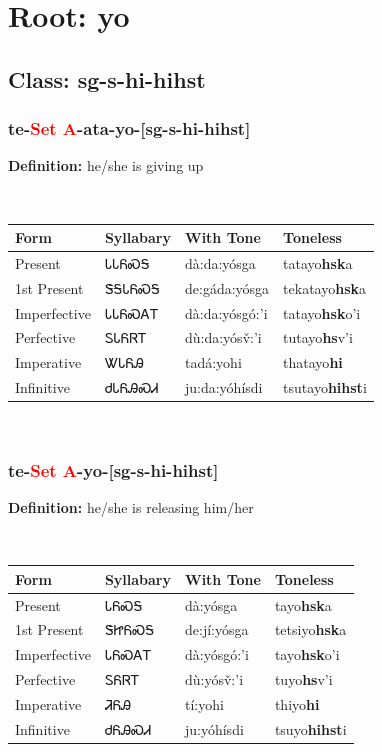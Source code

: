 \needspace{4in}
\section*{Root: yo}
\nopagebreak
{}
\needspace{3in}
\subsection*{Class: sg-s-hi-hihst}
\nopagebreak
\needspace{2in}
\subsubsection*{te{-}\textcolor{Red}{Set A}{-}ata{-}\textbf{yo}{-}[sg-s-hi-hihst]}
\nopagebreak
\textbf{Definition: } he/she is giving up
\\[0.5em]
\begin{tabularx}{\textwidth}{l X X X}%
\toprule%
\textbf{Form}&\textbf{Syllabary}&\textbf{With Tone}&\textbf{Toneless}\\%
\midrule%
Present&ᏓᏓᏲᏍᎦ&dà:da:yósga&tatayo\textbf{hsk}a\\%
1st Present&ᏕᎦᏓᏲᏍᎦ&de:gáda:yósga&tekatayo\textbf{hsk}a\\%
Imperfective&ᏓᏓᏲᏍᎪᎢ&dà:da:yósgó:’i&tatayo\textbf{hsk}o'i\\%
Perfective&ᏚᏓᏲᏒᎢ&dù:da:yósv̌:’i&tutayo\textbf{hs}v'i\\%
Imperative&ᏔᏓᏲᎯ&tadá:yohi&thatayo\textbf{hi}\\%
Infinitive&ᏧᏓᏲᎯᏍᏗ&ju:da:yóhísdi&tsutayo\textbf{hihst}i\\%
\bottomrule%
\end{tabularx}
\\[1em]
\needspace{2in}
\subsubsection*{te{-}\textcolor{Red}{Set A}{-}\textbf{yo}{-}[sg-s-hi-hihst]}
\nopagebreak
\textbf{Definition: } he/she is releasing him/her
\\[0.5em]
\begin{tabularx}{\textwidth}{l X X X}%
\toprule%
\textbf{Form}&\textbf{Syllabary}&\textbf{With Tone}&\textbf{Toneless}\\%
\midrule%
Present&ᏓᏲᏍᎦ&dà:yósga&tayo\textbf{hsk}a\\%
1st Present&ᏕᏥᏲᏍᎦ&de:jí:yósga&tetsiyo\textbf{hsk}a\\%
Imperfective&ᏓᏲᏍᎪᎢ&dà:yósgó:’i&tayo\textbf{hsk}o'i\\%
Perfective&ᏚᏲᏒᎢ&dù:yósv̌:’i&tuyo\textbf{hs}v'i\\%
Imperative&ᏘᏲᎯ&tí:yohi&thiyo\textbf{hi}\\%
Infinitive&ᏧᏲᎯᏍᏗ&ju:yóhísdi&tsuyo\textbf{hihst}i\\%
\bottomrule%
\end{tabularx}
\\[1em]
\needspace{2in}
